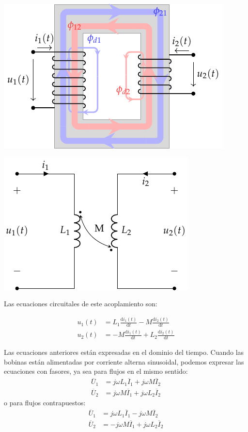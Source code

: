 \begin{center}
\includegraphics[height=0.2\textheight]{../figs/acoplamientoTikz_opuesto.pdf}
\end{center}
\begin{center}
\includegraphics[height=0.2\textheight]{../figs/acoplamiento_circuito_opuesto.pdf}
\end{center}

Las ecuaciones circuitales de este acoplamiento son:

\begin{align*}
  u_1(t) &= L_1 \frac{\mathrm{d}i_1(t)}{\mathrm{d}t} - M \frac{\mathrm{d}i_2(t)}{\mathrm{d}t}\\
  u_2(t) &= - M \frac{\mathrm{d}i_1(t)}{\mathrm{d}t} + L_2 \frac{\mathrm{d}i_2(t)}{\mathrm{d}t}
\end{align*}

Las ecuaciones anteriores están expresadas en el dominio del tiempo. Cuando las bobinas están alimentadas por corriente alterna sinusoidal, podemos expresar las ecuaciones con fasores, ya sea para flujos en el mismo sentido:
\begin{align*}
  \overline{U}_1 &= j \omega L_1 \overline{I}_1 + j \omega M \overline{I}_2\\
  \overline{U}_2 &= j \omega M \overline{I}_1 + j \omega L_2 \overline{I}_2
\end{align*}
o para flujos contrapuestos:
\begin{align*}
  \overline{U}_1 &= j \omega L_1 \overline{I}_1 - j \omega M \overline{I}_2\\
  \overline{U}_2 &= - j \omega M \overline{I}_1 + j \omega L_2 \overline{I}_2
\end{align*}


